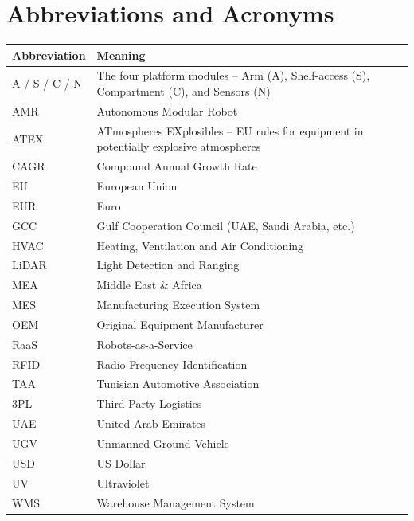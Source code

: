 \chapter*{Abbreviations and Acronyms}

\begin{longtable}{>{\raggedright\arraybackslash}p{}>{\raggedright\arraybackslash}p{}}
\toprule
\textbf{Abbreviation} & \textbf{Meaning} \\
\midrule
\endhead
A / S / C / N & The four platform modules -- Arm (A), Shelf-access (S), Compartment (C), and Sensors (N) \\
AMR & Autonomous Modular Robot \\
ATEX & ATmospheres EXplosibles -- EU rules for equipment in potentially explosive atmospheres \\
CAGR & Compound Annual Growth Rate \\
EU & European Union \\
EUR & Euro \\
GCC & Gulf Cooperation Council (UAE, Saudi Arabia, etc.) \\
HVAC & Heating, Ventilation and Air Conditioning \\
LiDAR & Light Detection and Ranging \\
MEA & Middle East \& Africa \\
MES & Manufacturing Execution System \\
OEM & Original Equipment Manufacturer \\
RaaS & Robots-as-a-Service \\
RFID & Radio-Frequency Identification \\
TAA & Tunisian Automotive Association \\
3PL & Third-Party Logistics \\
UAE & United Arab Emirates \\
UGV & Unmanned Ground Vehicle \\
USD & US Dollar \\
UV & Ultraviolet \\
WMS & Warehouse Management System \\
\bottomrule
\end{longtable}